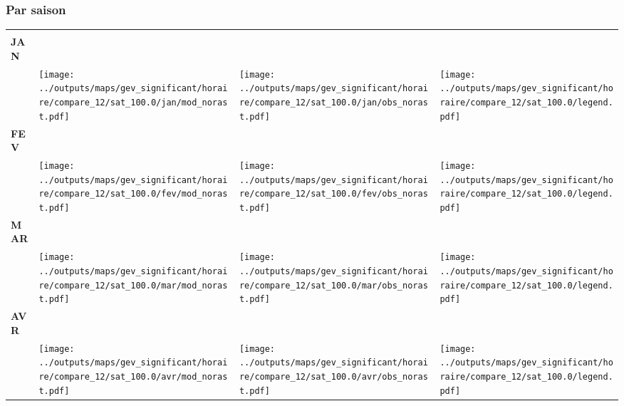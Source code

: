 \documentclass[
  letterpaper,
  DIV=11,
  numbers=noendperiod]{scrartcl}
\begin{document}
\subsubsection{Par saison}\label{par-saison-7}

\begin{longtable*}{m{2.0cm}m{7.9cm}m{7.9cm}m{1cm}}
 & \centering  & \centering  & \tabularnewline
\centering \textbf{JAN} \\[0.2em] \begin{tabular}{r@{\hspace{0.2em}}l}\end{tabular} & \centering \texttt{[image: ../outputs/maps/gev\_significant/horaire/compare\_12/sat\_100.0/jan/mod\_norast.pdf]} & \centering \texttt{[image: ../outputs/maps/gev\_significant/horaire/compare\_12/sat\_100.0/jan/obs\_norast.pdf]} & \centering \texttt{[image: ../outputs/maps/gev\_significant/horaire/compare\_12/sat\_100.0/legend.pdf]} \tabularnewline
\centering \textbf{FEV} \\[0.2em] \begin{tabular}{r@{\hspace{0.2em}}l}\end{tabular} & \centering \texttt{[image: ../outputs/maps/gev\_significant/horaire/compare\_12/sat\_100.0/fev/mod\_norast.pdf]} & \centering \texttt{[image: ../outputs/maps/gev\_significant/horaire/compare\_12/sat\_100.0/fev/obs\_norast.pdf]} & \centering \texttt{[image: ../outputs/maps/gev\_significant/horaire/compare\_12/sat\_100.0/legend.pdf]} \tabularnewline
\centering \textbf{MAR} \\[0.2em] \begin{tabular}{r@{\hspace{0.2em}}l}\end{tabular} & \centering \texttt{[image: ../outputs/maps/gev\_significant/horaire/compare\_12/sat\_100.0/mar/mod\_norast.pdf]} & \centering \texttt{[image: ../outputs/maps/gev\_significant/horaire/compare\_12/sat\_100.0/mar/obs\_norast.pdf]} & \centering \texttt{[image: ../outputs/maps/gev\_significant/horaire/compare\_12/sat\_100.0/legend.pdf]} \tabularnewline
\centering \textbf{AVR} \\[0.2em] \begin{tabular}{r@{\hspace{0.2em}}l}\end{tabular} & \centering \texttt{[image: ../outputs/maps/gev\_significant/horaire/compare\_12/sat\_100.0/avr/mod\_norast.pdf]} & \centering \texttt{[image: ../outputs/maps/gev\_significant/horaire/compare\_12/sat\_100.0/avr/obs\_norast.pdf]} & \centering \texttt{[image: ../outputs/maps/gev\_significant/horaire/compare\_12/sat\_100.0/legend.pdf]} \tabularnewline

\end{longtable*}
\end{document}
